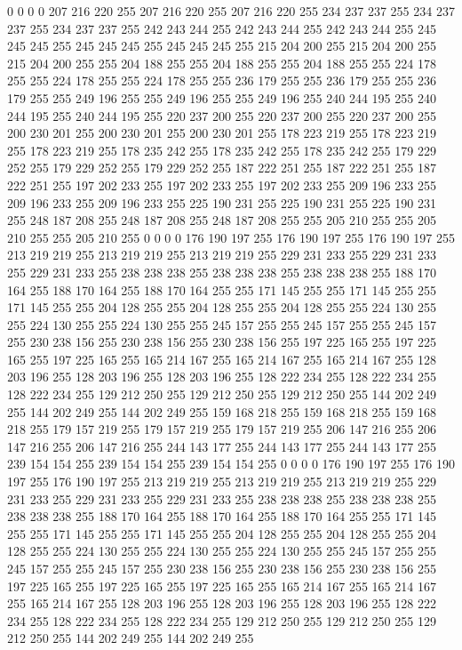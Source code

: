 0 0 0 0 207 216 220 255 207 216 220 255 207 216 220 255 234 237 237 255 234 237 237 255 234 237 237 255 242 243 244 255 242 243 244 255 242 243 244 255 245 245 245 255 245 245 245 255 245 245 245 255 215 204 200 255 215 204 200 255 215 204 200 255
255 204 188 255 255 204 188 255 255 204 188 255 255 224 178 255 255 224 178 255 255 224 178 255 255 236 179 255 255 236 179 255 255 236 179 255 255 249 196 255 255 249 196 255 255 249 196 255 240 244 195 255 240 244 195 255 240 244 195 255 220 237 200 255
220 237 200 255 220 237 200 255 200 230 201 255 200 230 201 255 200 230 201 255 178 223 219 255 178 223 219 255 178 223 219 255 178 235 242 255 178 235 242 255 178 235 242 255 179 229 252 255 179 229 252 255 179 229 252 255 187 222 251 255 187 222 251 255
187 222 251 255 197 202 233 255 197 202 233 255 197 202 233 255 209 196 233 255 209 196 233 255 209 196 233 255 225 190 231 255 225 190 231 255 225 190 231 255 248 187 208 255 248 187 208 255 248 187 208 255 255 205 210 255 255 205 210 255 255 205 210 255
0 0 0 0 176 190 197 255 176 190 197 255 176 190 197 255 213 219 219 255 213 219 219 255 213 219 219 255 229 231 233 255 229 231 233 255 229 231 233 255 238 238 238 255 238 238 238 255 238 238 238 255 188 170 164 255 188 170 164 255 188 170 164 255
255 171 145 255 255 171 145 255 255 171 145 255 255 204 128 255 255 204 128 255 255 204 128 255 255 224 130 255 255 224 130 255 255 224 130 255 255 245 157 255 255 245 157 255 255 245 157 255 230 238 156 255 230 238 156 255 230 238 156 255 197 225 165 255
197 225 165 255 197 225 165 255 165 214 167 255 165 214 167 255 165 214 167 255 128 203 196 255 128 203 196 255 128 203 196 255 128 222 234 255 128 222 234 255 128 222 234 255 129 212 250 255 129 212 250 255 129 212 250 255 144 202 249 255 144 202 249 255
144 202 249 255 159 168 218 255 159 168 218 255 159 168 218 255 179 157 219 255 179 157 219 255 179 157 219 255 206 147 216 255 206 147 216 255 206 147 216 255 244 143 177 255 244 143 177 255 244 143 177 255 239 154 154 255 239 154 154 255 239 154 154 255
0 0 0 0 176 190 197 255 176 190 197 255 176 190 197 255 213 219 219 255 213 219 219 255 213 219 219 255 229 231 233 255 229 231 233 255 229 231 233 255 238 238 238 255 238 238 238 255 238 238 238 255 188 170 164 255 188 170 164 255 188 170 164 255
255 171 145 255 255 171 145 255 255 171 145 255 255 204 128 255 255 204 128 255 255 204 128 255 255 224 130 255 255 224 130 255 255 224 130 255 255 245 157 255 255 245 157 255 255 245 157 255 230 238 156 255 230 238 156 255 230 238 156 255 197 225 165 255
197 225 165 255 197 225 165 255 165 214 167 255 165 214 167 255 165 214 167 255 128 203 196 255 128 203 196 255 128 203 196 255 128 222 234 255 128 222 234 255 128 222 234 255 129 212 250 255 129 212 250 255 129 212 250 255 144 202 249 255 144 202 249 255
